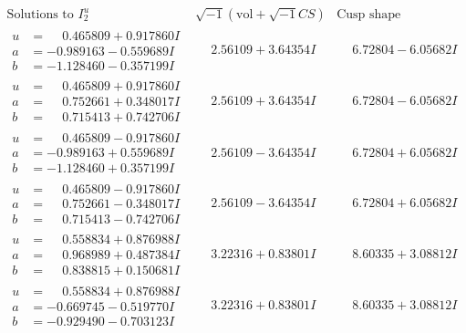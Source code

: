 \documentclass[1p]{elsarticle_modified}
\theoremstyle{definition}
\newcommand{\I}{\sqrt{-1}}
\begin{document}
$$\begin{array}{c|c|c}  
\text{Solutions to }I^u_{2}& \I (\text{vol} + \sqrt{-1}CS) & \text{Cusp shape}\\
 \hline 
\begin{aligned}
u &= \phantom{-}0.465809 + 0.917860 I \\
a &= -0.989163 - 0.559689 I \\
b &= -1.128460 - 0.357199 I\end{aligned}
 & \phantom{-}2.56109 + 3.64354 I & \phantom{-}6.72804 - 6.05682 I \\ \hline\begin{aligned}
u &= \phantom{-}0.465809 + 0.917860 I \\
a &= \phantom{-}0.752661 + 0.348017 I \\
b &= \phantom{-}0.715413 + 0.742706 I\end{aligned}
 & \phantom{-}2.56109 + 3.64354 I & \phantom{-}6.72804 - 6.05682 I \\ \hline\begin{aligned}
u &= \phantom{-}0.465809 - 0.917860 I \\
a &= -0.989163 + 0.559689 I \\
b &= -1.128460 + 0.357199 I\end{aligned}
 & \phantom{-}2.56109 - 3.64354 I & \phantom{-}6.72804 + 6.05682 I \\ \hline\begin{aligned}
u &= \phantom{-}0.465809 - 0.917860 I \\
a &= \phantom{-}0.752661 - 0.348017 I \\
b &= \phantom{-}0.715413 - 0.742706 I\end{aligned}
 & \phantom{-}2.56109 - 3.64354 I & \phantom{-}6.72804 + 6.05682 I \\ \hline\begin{aligned}
u &= \phantom{-}0.558834 + 0.876988 I \\
a &= \phantom{-}0.968989 + 0.487384 I \\
b &= \phantom{-}0.838815 + 0.150681 I\end{aligned}
 & \phantom{-}3.22316 + 0.83801 I & \phantom{-}8.60335 + 3.08812 I \\ \hline\begin{aligned}
u &= \phantom{-}0.558834 + 0.876988 I \\
a &= -0.669745 - 0.519770 I \\
b &= -0.929490 - 0.703123 I\end{aligned}
 & \phantom{-}3.22316 + 0.83801 I & \phantom{-}8.60335 + 3.08812 I \\ \hline\begin{aligned}

\end{aligned}
\end{array}$$
\end{document}
